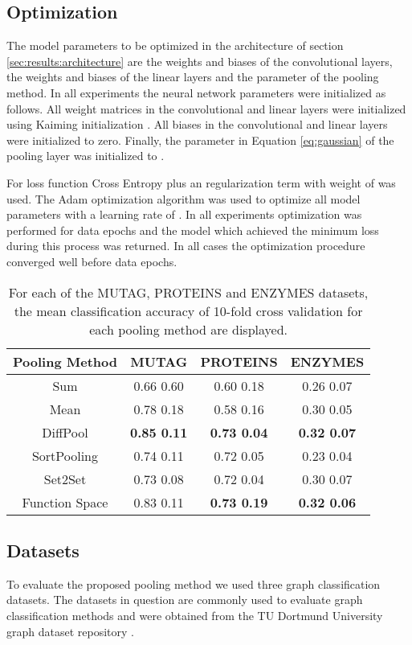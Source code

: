 \documentclass[runningheads]{llncs}
\begin{document}
\subsection{Optimization}
\label{sec:results:optimization}
The model parameters to be optimized in the architecture of section \ref{sec:results:architecture} are the weights and biases of the convolutional layers, the weights and biases of the linear layers and the parameter  of the pooling method. In all experiments the neural network parameters were initialized as follows. All weight matrices in the convolutional and linear layers were initialized using Kaiming initialization \cite{he2015delving}. All biases in the convolutional and linear layers were initialized to zero. Finally, the parameter  in Equation \ref{eq:gaussian} of the pooling layer was initialized to .

For loss function Cross Entropy plus an  regularization term with weight of  was used. The Adam optimization algorithm was used to optimize all model parameters with a learning rate of  \cite{kingma2014adam}. In all experiments optimization was performed for  data epochs and the model which achieved the minimum loss during this process was returned. In all cases the optimization procedure converged well before  data epochs. 

\begin{table*}[h!]
\centering
\begin{tabular}{c | c | c | c } 
 \textbf{Pooling Method} & \textbf{MUTAG} & \textbf{PROTEINS} & \textbf{ENZYMES}\\ [0.5ex] 
 \hline
 Sum & 0.66  0.60 & 0.60  0.18 & 0.26  0.07 \\ 
 Mean & 0.78  0.18 & 0.58  0.16 & 0.30  0.05 \\
 DiffPool & \textbf{0.85  0.11} & \textbf{0.73  0.04} & \textbf{0.32  0.07} \\
 SortPooling & 0.74  0.11 & 0.72  0.05 & 0.23  0.04 \\
 Set2Set & 0.73  0.08 & 0.72  0.04 & 0.30  0.07 \\
 Function Space & 0.83  0.11 & \textbf{0.73  0.19} & \textbf{0.32  0.06} \\ [1ex] 
 \hline
\end{tabular}
\caption{For each of the MUTAG, PROTEINS and ENZYMES datasets, the mean classification accuracy of 10-fold cross validation for each pooling method are displayed.}
\label{table:mean_accuracy}
\end{table*}

\subsection{Datasets}
\label{sec:results:dataset}
To evaluate the proposed pooling method we used three graph classification datasets. The datasets in question are commonly used to evaluate graph classification methods and were obtained from the TU Dortmund University graph dataset repository \cite{KKMMN2016}.
\end{document}
